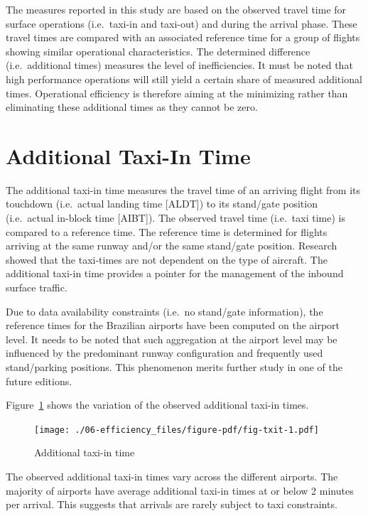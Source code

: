 \documentclass[
  a4paper,
  DIV=11,
  numbers=noendperiod]{scrreprt}
\begin{document}
The measures reported in this study are based on the observed travel
time for surface operations (i.e.~taxi-in and taxi-out) and during the
arrival phase. These travel times are compared with an associated
reference time for a group of flights showing similar operational
characteristics. The determined difference (i.e.~additional times)
measures the level of inefficiencies. It must be noted that high
performance operations will still yield a certain share of measured
additional times. Operational efficiency is therefore aiming at the
minimizing rather than eliminating these additional times as they cannot
be zero.

\hypertarget{additional-taxi-in-time}{%
\section{Additional Taxi-In Time}\label{additional-taxi-in-time}}

The additional taxi-in time measures the travel time of an arriving
flight from its touchdown (i.e.~actual landing time {[}ALDT{]}) to its
stand/gate position (i.e.~actual in-block time {[}AIBT{]}). The observed
travel time (i.e.~taxi time) is compared to a reference time. The
reference time is determined for flights arriving at the same runway
and/or the same stand/gate position. Research showed that the taxi-times
are not dependent on the type of aircraft. The additional taxi-in time
provides a pointer for the management of the inbound surface traffic.

Due to data availability constraints (i.e.~no stand/gate information),
the reference times for the Brazilian airports have been computed on the
airport level. It needs to be noted that such aggregation at the airport
level may be influenced by the predominant runway configuration and
frequently used stand/parking positions. This phenomenon merits further
study in one of the future editions.

Figure~\ref{fig-txit} shows the variation of the observed additional
taxi-in times.

\begin{figure}[h]

{\centering \texttt{[image: ./06-efficiency\_files/figure-pdf/fig-txit-1.pdf]}

}

\caption{\label{fig-txit}Additional taxi-in time}

\end{figure}

The observed additional taxi-in times vary across the different
airports. The majority of airports have average additional taxi-in times
at or below 2 minutes per arrival. This suggests that arrivals are
rarely subject to taxi constraints.
\end{document}
